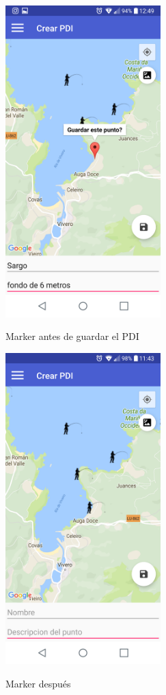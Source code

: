  
	\begin{figure}
\begin{minipage}[b]{0.5\linewidth} %
\centering
\includegraphics[width=6cm]{capturamovil/pdiguardar.png}
 \label{marker5}
\caption{Marker antes de guardar el PDI}

\end{minipage}
\hspace{0.5cm} %
\begin{minipage}[b]{0.5\linewidth}
\centering
\includegraphics[width=6cm]{capturamovil/pdiguardar2.png}
 \label{marker6}
\caption{Marker después }

\end{minipage}
		\label{fig:marker}

\end{figure} 
 
